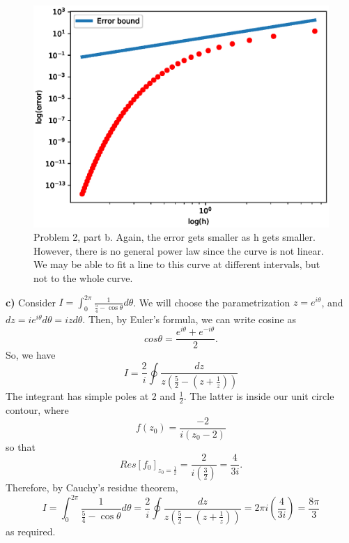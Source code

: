 \documentclass[12pt,letterpaper]{article}
\begin{document}
\begin{figure}[h]
    \centering
    \includegraphics[width = 12cm]{Problem_2/hw3_2b.eps}
    \caption{Problem 2, part b. Again, the error gets smaller as h gets smaller. However, there is no general power law since the curve is not linear. We may be able to fit a line to this curve at different intervals, but not to the whole curve. }
    \label{fig:2b}
\end{figure}
\newline 
\textbf{c)} Consider $I = \int_0^{2\pi} \frac{1}{\frac{5}{4} - \cos \theta} d\theta$. We will choose the parametrization $z = e^{i \theta}$, and $dz = i e^{i \theta} d \theta = i z d \theta$. Then, by Euler's formula, we can write cosine as $$ cos \theta = \frac{e^{i \theta}+e^{-i \theta}}{2}.$$ So, we have
\begin{equation}
 I = \frac{2}{i}   \oint  \frac{dz}{z(\frac{5}{2} - (z+\frac{1}{z}))}
\end{equation}
The integrant has simple poles at 2 and $\frac{1}{2}$. The latter is inside our unit circle contour, where $$ f(z_0) = \frac{-2}{i(z_0 - 2)}  $$ so that $$ Res[f_0]_{z_0 = \frac{1}{2}} = \frac{2}{i(\frac{3}{2})} = \frac{4}{3i}. $$
Therefore, by Cauchy's residue theorem,
\begin{equation}
    I = \int_0^{2\pi} \frac{1}{\frac{5}{4} - \cos \theta} d\theta =\frac{2}{i}   \oint  \frac{dz}{z(\frac{5}{2} - (z+\frac{1}{z}))} = 2 \pi i(\frac{4}{3i})  = \frac{8 \pi}{3}
\end{equation}
as required.
\end{document}

